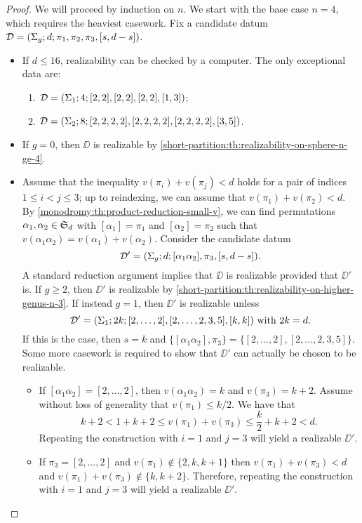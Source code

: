 \begin{proof}
We will proceed by induction on $n$. We start with the base case $n=4$, which requires the heaviest casework. Fix a candidate datum $\mathcal{D}=(\Sigma_{g};d;\pi_1,\pi_2,\pi_3,[s,d-s])$.
\begin{itemize}
\item If $d\le 16$, realizability can be checked by a computer. The only exceptional data are:
\begin{enumerate}[(1)]
\item $\mathcal{D}=(\Sigma_{1};4;[2, 2],[2, 2],[2, 2],[1, 3])$;
\item $\mathcal{D}=(\Sigma_{2};8;[2, 2, 2, 2],[2, 2, 2, 2],[2, 2, 2, 2],[3, 5])$.
\end{enumerate}
\item If $g=0$, then $\DD$ is realizable by \cref{short-partition:th:realizability-on-sphere-n-ge-4}.
\item Assume that the inequality $v(\pi_i)+v(\pi_j)<d$ holds for a pair of indices $1\le i<j\le 3$; up to reindexing, we can assume that $v(\pi_1)+v(\pi_2)<d$. By \cref{monodromy:th:product-reduction-small-v}, we can find permutations $\alpha_1,\alpha_2\in\symgroup[d]$ with $[\alpha_1]=\pi_1$ and $[\alpha_2]=\pi_2$ such that $v(\alpha_1\alpha_2)=v(\alpha_1)+v(\alpha_2)$. Consider the candidate datum
\[
\mathcal{D}'=(\Sigma_{g};d;[\alpha_1\alpha_2],\pi_3,[s,d-s]).
\]
A standard reduction argument implies that $\DD$ is realizable provided that $\DD'$ is. If $g\ge 2$, then $\DD'$ is realizable by \cref{short-partition:th:realizability-on-higher-genus-n-3}. If instead $g=1$, then $\DD'$ is realizable unless
\[
\text{$\mathcal{D}'=(\Sigma_{1};2k;[2,\ldots,2],[2,\ldots,2,3,5],[k,k])$ with $2k=d$.}
\]
If this is the case, then $s=k$ and $\{[\alpha_1\alpha_2],\pi_3\}=\{[2,\ldots,2],[2,\ldots,2,3,5]\}$. Some more casework is required to show that $\DD'$ can actually be chosen to be realizable.
\begin{itemize}
\item If $[\alpha_1\alpha_2]=[2,\ldots,2]$, then $v(\alpha_1\alpha_2)=k$ and $v(\pi_3)=k+2$. Assume without loss of generality that $v(\pi_1)\le k/2$. We have that
\[
k+2<1+k+2\le v(\pi_1)+v(\pi_3)\le \frac{k}{2}+k+2<d.
\]
Repeating the construction with $i=1$ and $j=3$ will yield a realizable $\DD'$.
\item If $\pi_3=[2,\ldots,2]$ and $v(\pi_1)\not\in\{2,k,k+1\}$ then $v(\pi_1)+v(\pi_3)<d$ and $v(\pi_1)+v(\pi_3)\not\in\{k,k+2\}$. Therefore, repeating the construction with $i=1$ and $j=3$ will yield a realizable $\DD'$.

\end{itemize}
\end{itemize}
\end{proof}
